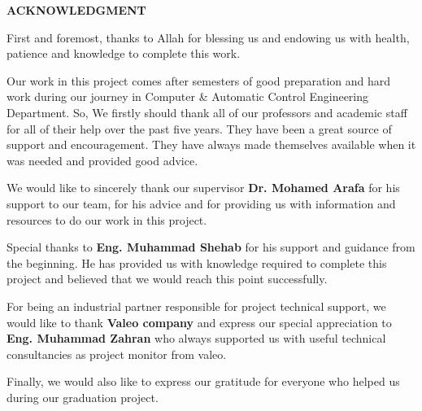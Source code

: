 \begin{titlepage}

\begin{center}
    \Large
    \vspace{0.9cm}
    \textbf{ACKNOWLEDGMENT}
    \end{center}

     \justify \hspace{1cm} First and foremost, thanks to Allah for blessing us and endowing us with health, patience and knowledge to complete this work.
    \par
    \justify \hspace{1cm}  Our work in this project comes after semesters of good preparation and hard work during our journey in Computer \& Automatic Control Engineering Department. So, We firstly should thank all of our professors and academic staff for all of their help over the past five years. They have been a great source of support and encouragement. They have always made themselves available when it was needed and provided good advice.
    \par
    \justify \hspace{1cm} We would like to sincerely thank our supervisor \textbf{Dr. Mohamed Arafa} for his support to our team, for his advice and for providing us with information and resources to do our work in this project.
    \par
    \justify \hspace{1cm} Special thanks to \textbf{Eng. Muhammad Shehab} for his support and guidance from the beginning. He has provided us with knowledge required to complete this project and believed that we would reach this point successfully.
    \par
    \justify \hspace{1cm} For being an industrial partner responsible for project technical support, we would like to thank \textbf{Valeo company} and express our special appreciation to \textbf{Eng. Muhammad Zahran} who always supported us with useful technical consultancies as project monitor from valeo.
    \par
    \justify \hspace{1cm} Finally, we would also like to express our gratitude for everyone who helped us during our graduation project.
\end{titlepage}

